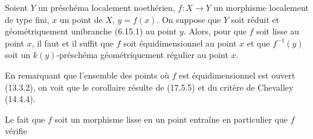\begin{corollary}[17.5.6]
\label{IV.17.5.6}
Soient $Y$ un préschéma localement noethérien, $f:X\to Y$ un morphisme localement de type fini, $x$ un point de $X$, $y=f(x)$. On suppose que $Y$ soit réduit et géométriquement unibranche (6.15.1) au point $y$. Alors, pour que $f$ soit lisse au point $x$, il faut et il suffit que $f$ soit équidimensionnel au point $x$ et que $f^{-1}(y)$ soit un $k(y)$-préschéma géométriquement régulier au point $x$.
\end{corollary}

En remarquant que l'ensemble des points où $f$ est équidimensionnel est ouvert (13.3.2), on voit que le corollaire résulte de (17.5.5) et du critère de Chevalley (14.4.4).

Le fait que $f$ soit un morphisme lisse en un point entraîne en particulier que $f$ vérifie


